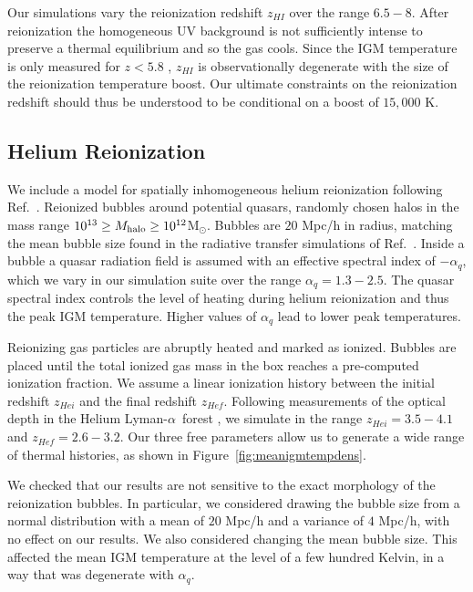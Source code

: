 \documentclass[a4paper,11pt]{article}
\newcommand{\Lya}{Lyman-$\alpha$}
\begin{document}
Our simulations vary the reionization redshift $z_{HI}$ over the range $6.5 - 8$. After reionization the homogeneous UV background is not sufficiently intense to preserve a thermal equilibrium and so the gas cools. Since the IGM temperature is only measured for $z < 5.8$ \cite{Gaikwad:2020}, $z_{HI}$ is observationally degenerate with the size of the reionization temperature boost. Our ultimate constraints on the reionization redshift should thus be understood to be conditional on a boost of $15,000$ K.




\subsection{Helium Reionization}
\label{sec:helium}

We include a model for spatially inhomogeneous helium reionization following Ref.~\cite{UptonSanderbeck:2020}. Reionized bubbles around potential quasars, randomly chosen halos in the mass range $10^{13} \geq M_{\rm halo}\geq 10^{12}$M$_{\odot}$. Bubbles are $20$ Mpc/h in radius, matching the mean bubble size found in the radiative transfer simulations of Ref.~\citep{McQuinn:2009}. Inside a bubble a quasar radiation field is assumed with an effective spectral index of $ - \alpha_q$, which we vary in our simulation suite over the range $\alpha_q  = 1.3 - 2.5$. The quasar spectral index controls the level of heating during helium reionization and thus the peak IGM temperature. Higher values of $\alpha_q$ lead to lower peak temperatures.

Reionizing gas particles are abruptly heated and marked as ionized. Bubbles are placed until the total ionized gas mass in the box reaches
a pre-computed ionization fraction. We assume a linear ionization history between the initial redshift $z_{Hei}$ and the final redshift $z_{Hef}$. Following measurements of the optical depth in the Helium \Lya~forest \cite{Worseck:2019}, we simulate in the range $z_{Hei} = 3.5 -  4.1$ and $z_{Hef} = 2.6 - 3.2$. Our three free parameters allow us to generate a wide range of thermal histories, as shown in Figure~\ref{fig:meanigmtempdens}.

We checked that our results are not sensitive to the exact morphology of the reionization bubbles. In particular, we considered drawing the bubble size from a normal distribution with a mean of $20$ Mpc/h and a variance of $4$ Mpc/h, with no effect on our results. We also considered changing the mean bubble size. This affected the mean IGM temperature at the level of a few hundred Kelvin, in a way that was degenerate with $\alpha_q$.
\end{document}
